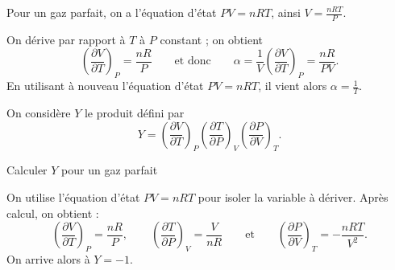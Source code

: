 
\begin{corrige}
Pour un gaz parfait, on a l'équation d'état $PV=nRT$, ainsi $V=\frac{nRT}{P}$. 

On dérive par rapport à $T$ à $P$ constant ; on obtient 
\[
\left(\frac{\partial V}{\partial T}\right)_P=\frac{nR}{P}
\qquad\text{et donc}\qquad
\alpha=\frac{1}{V}\left(\frac{\partial V}{\partial T}\right)_P=\frac{nR}{PV}.
\]
En utilisant à nouveau l'équation d'état $PV=nRT$, il vient alors $\alpha=\frac{1}{T}$.
\end{corrige}


\bigskip
On considère $Y$ le produit défini par
\[
Y=\left(\frac{\partial V}{\partial T}\right)_P\left(\frac{\partial T}{\partial P}\right)_V\left(\frac{\partial P}{\partial V}\right)_T.
\]
\minusBigskip\minusMedskip

\begin{enonce}
	Calculer $Y$ pour un gaz parfait
\end{enonce}


\begin{corrige}
On utilise l'équation d'état $PV=nRT$ pour isoler la variable à dériver. Après calcul, on obtient :
\[
\left(\frac{\partial V}{\partial T}\right)_P =\frac{nR}{P}
,\qquad
\left(\frac{\partial T}{\partial P}\right)_V =\frac{V}{nR}
\qquad\text{et}\qquad
\left(\frac{\partial P}{\partial V}\right)_T =-\frac{nRT}{V^2}.
\]
On arrive alors à $Y=-1$.
\end{corrige}


\finEntrainement


\afficheReponsesMelangees

\finFicheEntrainement                                                                        %




\ifdefined\mainIsLoaded\else
\printReponsesEtCorriges
\fi

